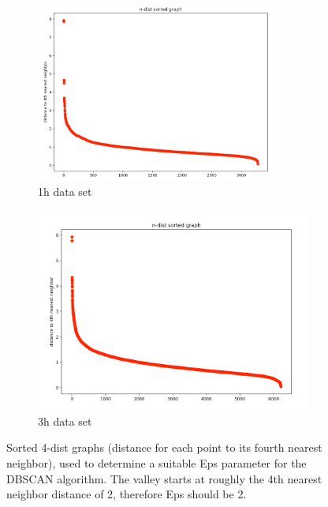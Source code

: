 \begin{figure}[H]
  \centering
  \begin{subfigure}{.5\textwidth}
    \centering
    \includegraphics[width=0.87\textwidth]{./images/kDistGraphDBSCAN1h.png}
  \caption{1h data set}
  \label{figure:kDistGraphDBSCAN1h}
  \end{subfigure}%
  \hfill
  \begin{subfigure}{.5\textwidth}
    \centering
    \includegraphics[width=1\textwidth]{./images/kDistGraphDBSCAN3h.png}
    \caption{3h data set}
    \label{figure:kDistGraphDBSCAN3h}
  \end{subfigure}
  \caption{Sorted 4-dist graphs (distance for each point to its fourth nearest neighbor), used to determine a suitable Eps parameter for the DBSCAN algorithm. The valley starts at roughly the 4th nearest neighbor distance of 2, therefore Eps should be 2.}
  \label{figure:kDistGraphDBSCAN}
  \end{figure}

